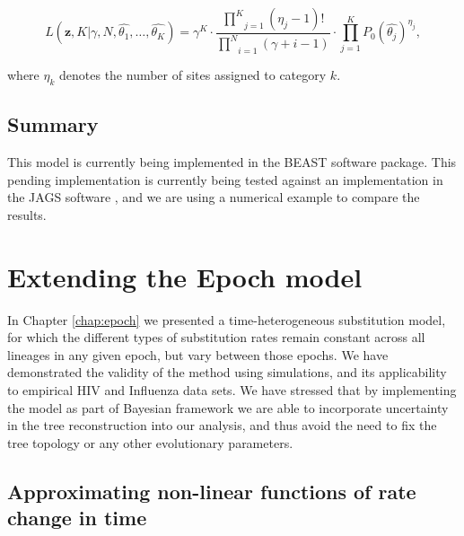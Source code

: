 \begin{equation}
L(\mathbf{z},K|\gamma,N,\hat{\theta_{1}},\ldots,\hat{\theta_{K}})=\gamma^{K}\cdot\frac{\underset{j=1}{\overset{K}{\prod}}\left(\eta_{j}-1\right)!}{\underset{i=1}{\overset{N}{\prod}}\left(\gamma+i-1\right)}\cdot\underset{j=1}{\overset{K}{\prod}}P_{0}\left(\hat{\theta_{j}}\right)^{\eta_{j}},
\label{eq:dppLike} 
\end{equation} 

\noindent 
where $\eta_{k}$ denotes the number of sites assigned to category $k$.

\subsection{Summary}

This model is currently being  implemented in the BEAST software package.
This pending implementation is currently being tested against an implementation in the JAGS software \citep{Plummer2003}, and we are using a numerical example to compare the results.

\section{Extending the Epoch model}

In Chapter \ref{chap:epoch} we presented a time-heterogeneous substitution model, for which the different types of substitution rates %
remain constant across all lineages in any given epoch, but vary between those epochs.
We have demonstrated the validity of the method using simulations, and its applicability to empirical HIV and Influenza data sets.
We have stressed that by implementing the model as part of Bayesian framework we are able to incorporate uncertainty in the tree reconstruction into our analysis, and thus avoid the need to fix the tree topology or any other evolutionary parameters.

\subsection{Approximating non-linear functions of rate change in time\label{sub:nonlinear}}


